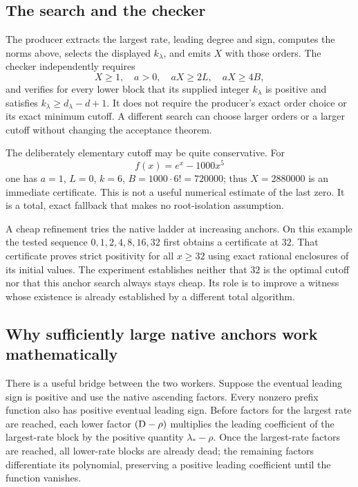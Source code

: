 \subsection{The search and the checker}

The producer extracts the largest rate, leading degree and sign, computes the
norms above, selects the displayed $k_\lambda$, and emits $X$ with those orders.
The checker independently requires
\[
 X\ge1,\quad a>0,\quad aX\ge2L,\quad aX\ge4B,
\]
and verifies for every lower block that its supplied integer $k_\lambda$ is
positive and satisfies $k_\lambda\ge d_\lambda-d+1$.
It does not require the producer's exact order choice or its exact minimum
cutoff. A different search can choose larger orders or a larger cutoff without
changing the acceptance theorem.

The deliberately elementary cutoff may be quite conservative. For
\[
 f(x)=e^x-1000x^5
\]
one has $a=1$, $L=0$, $k=6$, $B=1000\cdot6!=720000$; thus $X=2880000$ is
an immediate certificate. This is not a useful numerical estimate of the last
zero. It is a total, exact fallback that makes no root-isolation assumption.

A cheap refinement tries the native ladder at increasing anchors. On this
example the tested sequence $0,1,2,4,8,16,32$ first obtains a certificate at
$32$. That certificate proves strict positivity for all $x\ge32$ using exact
rational enclosures of its initial values. The experiment establishes neither
that $32$ is the optimal cutoff nor that this anchor search always stays cheap.
Its role is to improve a witness whose existence is already established by a
different total algorithm.

\subsection{Why sufficiently large native anchors work mathematically}

There is a useful bridge between the two workers. Suppose the eventual leading
sign is positive and use the native ascending factors. Every nonzero prefix
function also has positive eventual leading sign. Before factors for the
largest rate are reached, each lower factor $(\mathrm D-\rho)$ multiplies the leading
coefficient of the largest-rate block by the positive quantity
$\lambda_*-\rho$. Once the largest-rate factors are reached, all lower-rate
blocks are already dead; the remaining factors differentiate its polynomial,
preserving a positive leading coefficient until the function vanishes.

